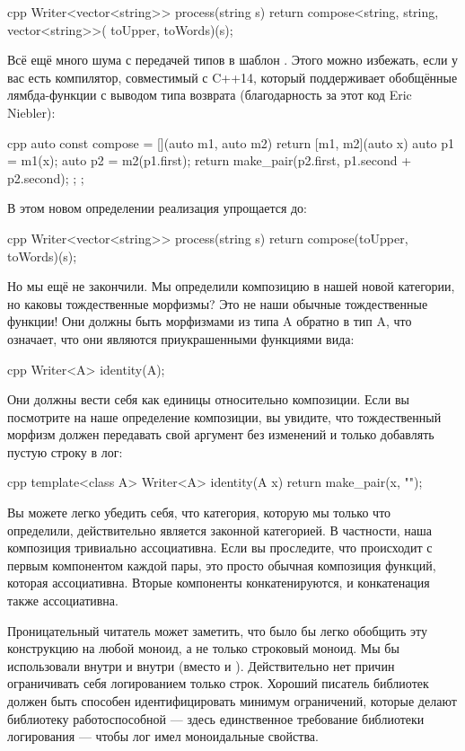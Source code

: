 \begin{snip}{cpp}
Writer<vector<string>> process(string s) {
    return compose<string, string, vector<string>>(
        toUpper, toWords)(s);
}
\end{snip}
Всё ещё много шума с передачей типов в
шаблон . Этого можно избежать, если у вас есть
компилятор, совместимый с C++14, который поддерживает обобщённые лямбда-функции с
выводом типа возврата (благодарность за этот код Eric Niebler):

\begin{snip}{cpp}
auto const compose = [](auto m1, auto m2) { 
    return [m1, m2](auto x) { 
        auto p1 = m1(x);
        auto p2 = m2(p1.first);
        return make_pair(p2.first, p1.second + p2.second);
    };
};
\end{snip}
В этом новом определении реализация 
упрощается до:

\begin{snip}{cpp}
Writer<vector<string>> process(string s) {
    return compose(toUpper, toWords)(s);
}
\end{snip}
Но мы ещё не закончили. Мы определили композицию в нашей новой
категории, но каковы тождественные морфизмы? Это не наши обычные
тождественные функции! Они должны быть морфизмами из типа A обратно в тип
A, что означает, что они являются приукрашенными функциями вида:

\begin{snip}{cpp}
Writer<A> identity(A);
\end{snip}
Они должны вести себя как единицы относительно композиции. Если вы посмотрите
на наше определение композиции, вы увидите, что тождественный морфизм
должен передавать свой аргумент без изменений и только добавлять пустую
строку в лог:

\begin{snip}{cpp}
template<class A> Writer<A> identity(A x) {
    return make_pair(x, "");
}
\end{snip}
Вы можете легко убедить себя, что категория, которую мы только что определили,
действительно является законной категорией. В частности, наша композиция
тривиально ассоциативна. Если вы проследите, что происходит с первым
компонентом каждой пары, это просто обычная композиция функций, которая
ассоциативна. Вторые компоненты конкатенируются, и
конкатенация также ассоциативна.

Проницательный читатель может заметить, что было бы легко обобщить эту
конструкцию на любой моноид, а не только строковый моноид. Мы бы использовали
 внутри  и  внутри
 (вместо \code{+} и ). Действительно
нет причин ограничивать себя логированием только строк. Хороший писатель библиотек
должен быть способен идентифицировать минимум ограничений, которые
делают библиотеку работоспособной --- здесь единственное требование библиотеки логирования ---
чтобы лог имел моноидальные свойства.

